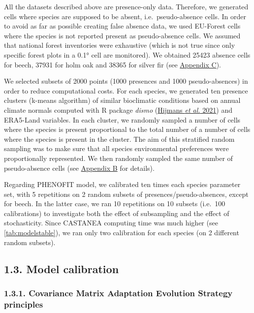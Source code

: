\documentclass[11pt,]{article}
\begin{document}
All the datasets described above are presence-only data. Therefore, we
generated cells where species are supposed to be absent,
i.e.~pseudo-absence cells. In order to avoid as far as possible creating
false absence data, we used EU-Forest cells where the species is not
reported present as pseudo-absence cells. We assumed that national
forest inventories were exhaustive (which is not true since only
specific forest plots in a 0.1° cell are monitored). We obtained 25423
absence cells for beech, 37931 for holm oak and 38365 for silver fir
(see \protect\hyperlink{appendixC}{Appendix C}).

We selected subsets of 2000 points (1000 presences and 1000
pseudo-absences) in order to reduce computational costs. For each
species, we generated ten presence clusters (k-means algorithm) of
similar bioclimatic conditions based on annual climate normals computed
with R package \emph{dismo} (\protect\hyperlink{ref-Hijmans2021}{Hijmans
\emph{et al.} 2021}) and ERA5-Land variables. In each cluster, we
randomly sampled a number of cells where the species is present
proportional to the total number of a number of cells where the species
is present in the cluster. The aim of this stratified random sampling
was to make sure that all species environmental preferences were
proportionally represented. We then randomly sampled the same number of
pseudo-absence cells (see \protect\hyperlink{appendixB}{Appendix B} for
details).

Regarding PHENOFIT model, we calibrated ten times each species parameter
set, with 5 repetitions on 2 random subsets of
presences/pseudo-absences, except for beech. In the latter case, we ran
10 repetitions on 10 subsets (i.e.~100 calibrations) to investigate both
the effect of subsampling and the effect of stochasticity. Since
CASTANEA computing time was much higher (see \autoref{tab:modelstable}),
we ran only two calibration for each species (on 2 different random
subsets).

\hypertarget{model-calibration}{%
\subsection{1.3. Model calibration}\label{model-calibration}}

\hypertarget{covariance-matrix-adaptation-evolution-strategy-principles}{%
\subsubsection{1.3.1. Covariance Matrix Adaptation Evolution Strategy
principles}\label{covariance-matrix-adaptation-evolution-strategy-principles}}
\end{document}
